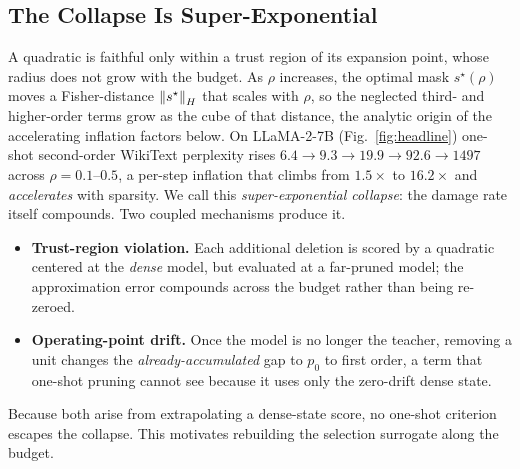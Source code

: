 \subsection{The Collapse Is Super-Exponential}
\label{sec:superexp}
A quadratic is faithful only within a trust region of its expansion point, whose radius does not grow
with the budget. As $\rho$ increases, the optimal mask $s^\star(\rho)$ moves a Fisher-distance
$\left\lVert s^\star \right\rVert_{H}$ that scales with $\rho$, so the neglected third- and higher-order terms grow as
the cube of that distance, the analytic origin of the accelerating inflation factors below.
On LLaMA-2-7B (Fig.~\ref{fig:headline}) one-shot second-order WikiText perplexity rises
$6.4\!\to\!9.3\!\to\!19.9\!\to\!92.6\!\to\!1497$ across $\rho{=}0.1$--$0.5$, a per-step inflation that
climbs from $1.5\times$ to $16.2\times$ and \emph{accelerates} with sparsity. We call this
\emph{super-exponential collapse}: the damage rate itself compounds. Two coupled mechanisms produce it.
\begin{itemize}
\item \textbf{Trust-region violation.} Each additional deletion is scored by a quadratic centered at
the \emph{dense} model, but evaluated at a far-pruned model; the approximation error compounds across
the budget rather than being re-zeroed.
\item \textbf{Operating-point drift.} Once the model is no longer the teacher, removing a unit changes
the \emph{already-accumulated} gap to $p_0$ to first order, a term that one-shot pruning cannot see
because it uses only the zero-drift dense state.
\end{itemize}
Because both arise from extrapolating a dense-state score, no one-shot criterion escapes the collapse.
This motivates rebuilding the selection surrogate along the budget.

